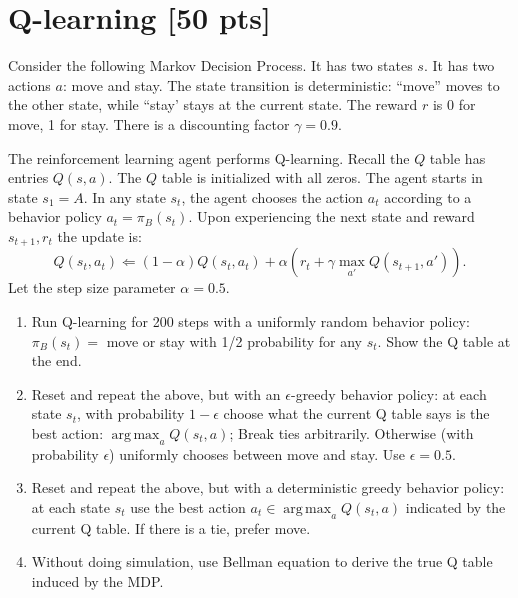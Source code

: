 \documentclass[a4paper]{article}
\theoremstyle{definition}
\DeclareMathOperator*{\argmax}{arg\,max}
\begin{document}
\section{Q-learning [50 pts]}
Consider the following Markov Decision Process.
It has two states $s$.
It has two actions $a$: move and stay.
The state transition is deterministic: ``move'' moves to the other state, while ``stay' stays at the current state.
The reward $r$ is 0 for move,  1 for stay. 
There is a discounting factor $\gamma=0.9$.
\\

The reinforcement learning agent performs Q-learning.  Recall the $Q$ table has entries $Q(s,a)$.
The $Q$ table is initialized with all zeros.
The agent starts in state $s_1=A$.
In any state $s_t$, the agent chooses the action $a_t$ according to a behavior policy $a_t = \pi_B(s_t)$.
Upon experiencing the next state and reward $s_{t+1}, r_t$ the update is:
$$Q(s_t, a_t) \Leftarrow (1-\alpha) Q(s_t, a_t) + \alpha \left( r_t + \gamma \max_{a'} Q(s_{t+1}, a') \right).$$
Let the step size parameter $\alpha=0.5$.

\begin{enumerate}
\item Run Q-learning for 200 steps with a uniformly random behavior policy: $\pi_B(s_t)=$ move or stay with 1/2 probability for any $s_t$.
Show the Q table at the end.



\item Reset and repeat the above, but with an $\epsilon$-greedy behavior policy: at each state $s_t$, with probability $1-\epsilon$ choose what the current Q table says is the best action: $\argmax_a Q(s_t,a)$; Break ties arbitrarily. Otherwise (with probability $\epsilon$) uniformly chooses between move and stay.
Use $\epsilon=0.5$.


\item Reset and repeat the above, but with a deterministic greedy behavior policy: at each state $s_t$ use the best action $a_t \in \argmax_a Q(s_t,a)$ indicated by the current Q table. If there is a tie, prefer move.

\item Without doing simulation, use Bellman equation to derive the true Q table induced by the MDP.

\end{enumerate}
\end{document}
